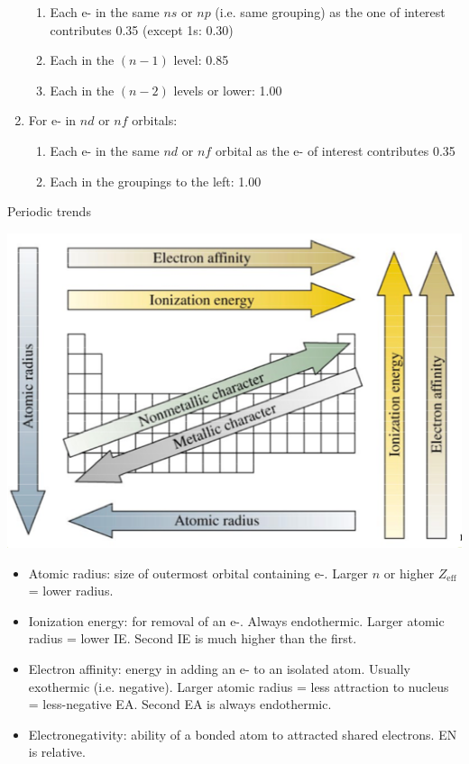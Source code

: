\documentclass[10pt,landscape]{article}
\begin{document}
\begin{multicols}{3}
\begin{enumerate}
	\begin{enumerate}
	\item Each e- in the same $ns$ or $np$ (i.e. same grouping) as the one of interest contributes 0.35 (except 1s: 0.30)
	\item Each in the $(n-1)$ level: 0.85
	\item Each in the $(n-2)$ levels or lower: 1.00
	\end{enumerate}

\item For e- in $nd$ or $nf$ orbitals:

	\begin{enumerate}
	\item Each e- in the same $nd$ or $nf$  orbital as the e- of interest contributes 0.35
	\item Each in the groupings to the left: 1.00
	\end{enumerate}

\end{enumerate}

Periodic trends

\begin{center}
\includegraphics[width=\linewidth]{./chm2311/periodic-table-trends.png}
\end{center}
 
\begin{itemize} 
\item Atomic radius: size of outermost orbital containing e-. Larger $n$ or higher $Z_\text{eff}$ = lower radius.
\item Ionization energy: for removal of an e-. Always endothermic. Larger atomic radius  = lower IE.  Second IE is much higher than the first.
\item Electron affinity: energy in adding an e- to an isolated atom. Usually exothermic (i.e. negative). Larger atomic radius = less attraction to nucleus = less-negative EA. Second EA is always endothermic. 
\item Electronegativity: ability of a bonded atom to attracted shared electrons. EN is relative.
\end{itemize}




\end{multicols}
\end{document}
